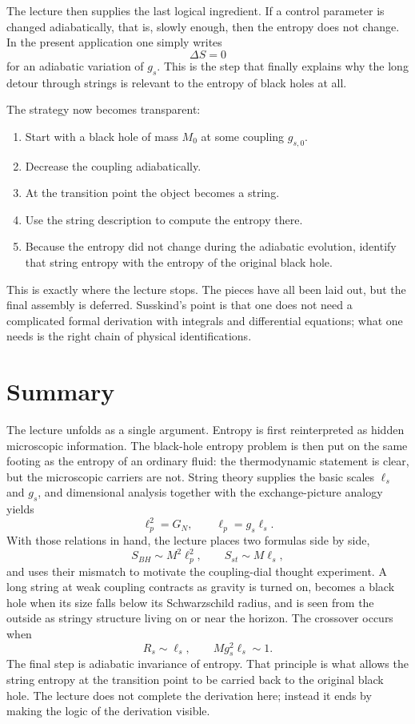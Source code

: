 The lecture then supplies the last logical ingredient. If a control parameter is changed adiabatically, that is, slowly enough, then the entropy does not change. In the present application one simply writes
\begin{equation}
\Delta S=0
\end{equation}
for an adiabatic variation of \(g_s\). This is the step that finally explains why the long detour through strings is relevant to the entropy of black holes at all.

The strategy now becomes transparent:
\begin{enumerate}
\item Start with a black hole of mass \(M_0\) at some coupling \(g_{s,0}\).
\item Decrease the coupling adiabatically.
\item At the transition point the object becomes a string.
\item Use the string description to compute the entropy there.
\item Because the entropy did not change during the adiabatic evolution, identify that string entropy with the entropy of the original black hole.
\end{enumerate}
This is exactly where the lecture stops. The pieces have all been laid out, but the final assembly is deferred. Susskind's point is that one does not need a complicated formal derivation with integrals and differential equations; what one needs is the right chain of physical identifications.

\section{Summary}

The lecture unfolds as a single argument. Entropy is first reinterpreted as hidden microscopic information. The black-hole entropy problem is then put on the same footing as the entropy of an ordinary fluid: the thermodynamic statement is clear, but the microscopic carriers are not. String theory supplies the basic scales \(\ell_s\) and \(g_s\), and dimensional analysis together with the exchange-picture analogy yields
\begin{equation}
\ell_p^2=G_N,
\qquad
\ell_p=g_s\ell_s.
\end{equation}
With those relations in hand, the lecture places two formulas side by side,
\begin{equation}
S_{BH}\sim M^2\ell_p^2,
\qquad
S_{st}\sim M\ell_s,
\end{equation}
and uses their mismatch to motivate the coupling-dial thought experiment. A long string at weak coupling contracts as gravity is turned on, becomes a black hole when its size falls below its Schwarzschild radius, and is seen from the outside as stringy structure living on or near the horizon. The crossover occurs when
\begin{equation}
R_s\sim \ell_s,
\qquad
Mg_s^2\ell_s\sim 1.
\end{equation}
The final step is adiabatic invariance of entropy. That principle is what allows the string entropy at the transition point to be carried back to the original black hole. The lecture does not complete the derivation here; instead it ends by making the logic of the derivation visible.